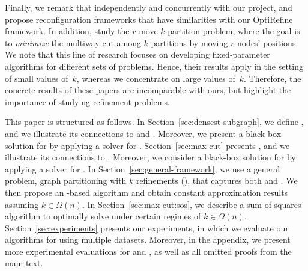 Finally, we remark that independently and concurrently with our project, \citet{fellows2023solution} and \citet{ grobler2023solution} propose reconfiguration frameworks that have similarities with our OptiRefine framework.
In addition, \citet{dalirrooyfard2024graph} study the $r$-move-$k$-partition problem, where the goal is to \emph{minimize} the multi\-way cut among $k$ partitions by moving $r$ nodes' positions. 
We note that this line of research focuses on developing fixed-parameter
algorithms for different sets of problems. Hence, their results apply in the
setting of small values of~$k$, whereas we concentrate on large values of~$k$.
Therefore, the concrete results of these papers are incomparable with ours, but
highlight the importance of studying refinement problems.

\vspace{1mm}
This paper is structured as follows.
In Section~\ref{sec:densest-subgraph}, we define \dskc, and we illustrate its
connections to \kdense and \dks. Moreover, we present a black-box
solution for \dskc by applying a solver for \dks. 
Section~\ref{sec:max-cut} presents \maxcutkc, and we illustrate its connections
to \ccmaxcut. Moreover, we consider a black-box solution for \maxcutkc by applying a solver for \maxcut. 
In Section~\ref{sec:general-framework}, we use a general problem, graph
partitioning with $k$ refinements (\gpkc), that captures both \dskc and
\maxcutkc. We then propose an \sdp-based algorithm and
obtain constant approximation results assuming $k \in \Omega(n)$. 
In Section~\ref{sec:max-cut:sos}, we describe a sum-of-squares algorithm to optimally solve \maxcutkc under certain regimes of $k \in \Omega(n)$.
Section~\ref{sec:experiments} presents our experiments, in which we evaluate our
algorithms for \dskc using multiple datasets. Moreover, in the appendix, we present more
experimental evaluations for \dskc and \maxcutkc, as well as all
omitted proofs from the main text.